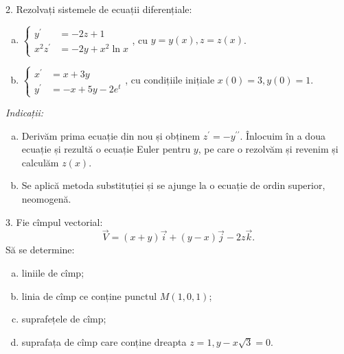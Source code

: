 2. Rezolvați sistemele de ecuații diferențiale:
\begin{enumerate}[(a)]
\item $ \begin{cases}
    y^\prime &= -2z + 1 \\
    x^2 z^\prime &= -2y + x^2 \ln x
  \end{cases} $, cu $ y = y(x), z = z(x) $.
\item $ \begin{cases}
    x^\prime &= x + 3y \\
    y^\prime &= -x + 5y - 2e^t
  \end{cases} $, cu condițiile inițiale $ x(0) = 3, y(0) = 1 $.
\end{enumerate}

\emph{Indicații:}
\begin{enumerate}[(a)]
\item Derivăm prima ecuație din nou și obținem $ z^\prime = - y^{\prime\prime} $. Înlocuim în
  a doua ecuație și rezultă o ecuație Euler pentru $ y $, pe care o rezolvăm și revenim și calculăm
  $ z(x) $.
\item Se aplică metoda substituției și se ajunge la o ecuație de ordin superior, neomogenă.
\end{enumerate}

\vspace{1cm}

3. Fie cîmpul vectorial:
\[
  \vec{V} = (x + y)\vec{i} + (y - x)\vec{j} - 2z\vec{k}.
\]
Să se determine:
\begin{enumerate}[(a)]
\item liniile de cîmp;
\item linia de cîmp ce conține punctul $ M(1, 0, 1) $;
\item suprafețele de cîmp;
\item suprafața de cîmp care conține dreapta $ z = 1, y - x\sqrt{3} = 0 $.
\end{enumerate}

